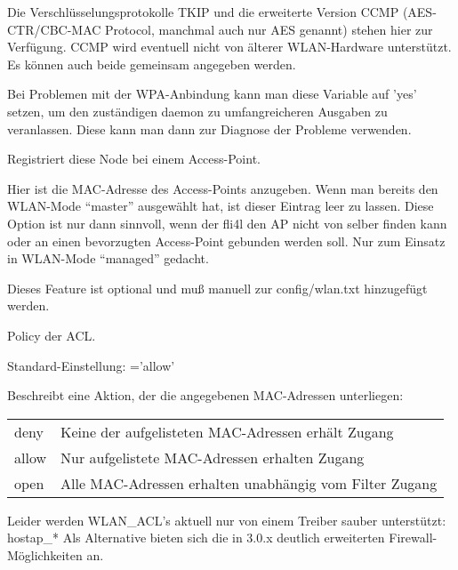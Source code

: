 \begin{description}
      Die Verschlüsselungsprotokolle TKIP und die erweiterte Version CCMP 
      (AES-CTR/CBC-MAC Protocol, manchmal auch nur AES genannt) stehen hier zur Verfügung. CCMP wird eventuell
      nicht von älterer WLAN-Hardware unterstützt. Es können auch beide
      gemeinsam angegeben werden.
      

      Bei Problemen mit der WPA-Anbindung kann man diese Variable auf
      'yes' setzen, um den zuständigen daemon zu umfangreicheren
      Ausgaben zu veranlassen. Diese kann man dann zur Diagnose der
      Probleme verwenden.


        Registriert diese Node bei einem Access-Point.

        Hier ist die MAC-Adresse des Access-Points anzugeben.
        Wenn man bereits den WLAN-Mode ``master'' ausgewählt hat, ist dieser Eintrag leer zu lassen.
        Diese Option ist nur dann sinnvoll, wenn der fli4l den AP nicht von selber finden kann oder an einen bevorzugten Access-Point gebunden werden soll.
        Nur zum Einsatz in WLAN-Mode ``managed'' gedacht.

        Dieses Feature ist optional und muß manuell zur config/wlan.txt hinzugefügt werden.


        Policy der ACL.

        Standard-Einstellung: ='allow'

        Beschreibt eine Aktion, der die angegebenen MAC-Adressen unterliegen:

        \begin{tabular}[h]{ll}
          deny  & Keine der aufgelisteten MAC-Adressen erhält Zugang \\
          allow & Nur aufgelistete MAC-Adressen erhalten Zugang \\
          open  & Alle MAC-Adressen erhalten unabhängig vom Filter Zugang \\
        \end{tabular}
        
        Leider werden WLAN\_ACL's aktuell nur von einem Treiber sauber unterstützt: hostap\_*
        Als Alternative bieten sich die in 3.0.x deutlich erweiterten Firewall-Möglichkeiten an.


\end{description}
